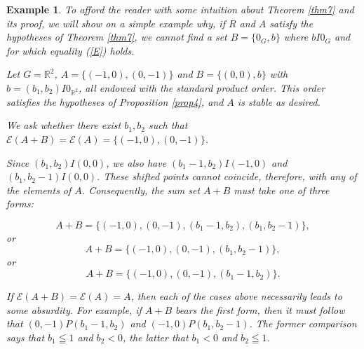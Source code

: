\documentclass[pdflatex,sn-apa,11pt]{sn-jnl}%
\newtheorem{example}{Example}%
\begin{document}
\begin{example}
\label{ex7}
To afford the reader with some intuition about Theorem \ref{thm7} and its proof, we will show on a simple example why, if $R$ and $A$ satisfy the hypotheses of Theorem \ref{thm7}, we cannot find a set $B = \{0_{G}, b\}$ where $bI0_{G}$ and for which equality (\ref{E}) holds. 

Let $G = \mathbb{R}^{2}$, $A = \{(-1, 0), (0, -1)\}$ and $B = \{(0, 0), b\}$ with $b = (b_1, b_2)I0_{\mathbb{R}^2}$, all endowed with the standard product order. This order satisfies the hypotheses of Proposition \ref{prop4}, and $A$ is stable as desired.


We ask whether there exist $b_1, b_2$ such that $\mathscr{E}(A+B) = \mathscr{E}(A) = \{(-1, 0), (0, -1)\}$.

Since $(b_1, b_2)I(0, 0)$, we also have $(b_1-1, b_2)I(-1, 0)$ and $(b_1, b_2-1)I(0, 0)$. These shifted points cannot coincide, therefore, with any of the elements of $A$. Consequently, the sum set $A+B$ must take one of three forms: 

\begin{equation*}
A+B = \{(-1, 0), (0, -1), (b_{1}-1, b_{2}), (b_{1}, b_{2}-1)\},
\end{equation*}
or
\begin{equation*}
A+B = \{(-1, 0), (0, -1), (b_{1}, b_{2}-1)\},
\end{equation*}
or
\begin{equation*}
A+B = \{(-1, 0), (0, -1), (b_{1}-1, b_{2})\}.
\end{equation*}

If $\mathscr{E}(A+B) = \mathscr{E}(A) = A$, then each of the cases above necessarily leads to some absurdity. For example, if $A+B$ bears the first form, then it must follow that $(0,-1)P(b_{1}-1, b_2)$ and $(-1,0)P(b_1, b_2-1)$. The former comparison says that $b_1 \leqq 1 $ and $b_2 < 0$, the latter that $b_1 < 0$ and $b_2 \leqq 1$.  


\end{example}
\end{document}
